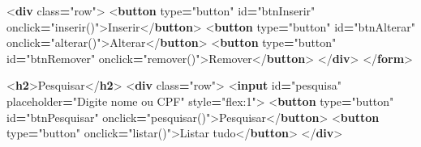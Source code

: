 \documentclass[
]{book}
\newenvironment{Shaded}{\begin{snugshade}}{\end{snugshade}}
\newcommand{\DataTypeTok}[1]{\textcolor[rgb]{0.13,0.29,0.53}{#1}}
\newcommand{\KeywordTok}[1]{\textcolor[rgb]{0.13,0.29,0.53}{\textbf{#1}}}
\newcommand{\NormalTok}[1]{#1}
\newcommand{\OperatorTok}[1]{\textcolor[rgb]{0.81,0.36,0.00}{\textbf{#1}}}
\newcommand{\OtherTok}[1]{\textcolor[rgb]{0.56,0.35,0.01}{#1}}
\newcommand{\StringTok}[1]{\textcolor[rgb]{0.31,0.60,0.02}{#1}}
\begin{document}
\begin{Shaded}
\begin{Highlighting}[]
  \DataTypeTok{\textless{}}\KeywordTok{div}\OtherTok{ class}\OperatorTok{=}\StringTok{"row"}\DataTypeTok{\textgreater{}}
    \DataTypeTok{\textless{}}\KeywordTok{button}\OtherTok{ type}\OperatorTok{=}\StringTok{"button"}\OtherTok{ id}\OperatorTok{=}\StringTok{"btnInserir"}\OtherTok{ onclick}\OperatorTok{=}\StringTok{"inserir()"}\DataTypeTok{\textgreater{}}\NormalTok{Inserir}\DataTypeTok{\textless{}/}\KeywordTok{button}\DataTypeTok{\textgreater{}}
    \DataTypeTok{\textless{}}\KeywordTok{button}\OtherTok{ type}\OperatorTok{=}\StringTok{"button"}\OtherTok{ id}\OperatorTok{=}\StringTok{"btnAlterar"}\OtherTok{ onclick}\OperatorTok{=}\StringTok{"alterar()"}\DataTypeTok{\textgreater{}}\NormalTok{Alterar}\DataTypeTok{\textless{}/}\KeywordTok{button}\DataTypeTok{\textgreater{}}
    \DataTypeTok{\textless{}}\KeywordTok{button}\OtherTok{ type}\OperatorTok{=}\StringTok{"button"}\OtherTok{ id}\OperatorTok{=}\StringTok{"btnRemover"}\OtherTok{ onclick}\OperatorTok{=}\StringTok{"remover()"}\DataTypeTok{\textgreater{}}\NormalTok{Remover}\DataTypeTok{\textless{}/}\KeywordTok{button}\DataTypeTok{\textgreater{}}
  \DataTypeTok{\textless{}/}\KeywordTok{div}\DataTypeTok{\textgreater{}}
\DataTypeTok{\textless{}/}\KeywordTok{form}\DataTypeTok{\textgreater{}}

\DataTypeTok{\textless{}}\KeywordTok{h2}\DataTypeTok{\textgreater{}}\NormalTok{Pesquisar}\DataTypeTok{\textless{}/}\KeywordTok{h2}\DataTypeTok{\textgreater{}}
\DataTypeTok{\textless{}}\KeywordTok{div}\OtherTok{ class}\OperatorTok{=}\StringTok{"row"}\DataTypeTok{\textgreater{}}
  \DataTypeTok{\textless{}}\KeywordTok{input}\OtherTok{ id}\OperatorTok{=}\StringTok{"pesquisa"}\OtherTok{ placeholder}\OperatorTok{=}\StringTok{"Digite nome ou CPF"}\OtherTok{ style}\OperatorTok{=}\StringTok{"flex:1"}\DataTypeTok{\textgreater{}}
  \DataTypeTok{\textless{}}\KeywordTok{button}\OtherTok{ type}\OperatorTok{=}\StringTok{"button"}\OtherTok{ id}\OperatorTok{=}\StringTok{"btnPesquisar"}\OtherTok{ onclick}\OperatorTok{=}\StringTok{"pesquisar()"}\DataTypeTok{\textgreater{}}\NormalTok{Pesquisar}\DataTypeTok{\textless{}/}\KeywordTok{button}\DataTypeTok{\textgreater{}}
  \DataTypeTok{\textless{}}\KeywordTok{button}\OtherTok{ type}\OperatorTok{=}\StringTok{"button"}\OtherTok{ onclick}\OperatorTok{=}\StringTok{"listar()"}\DataTypeTok{\textgreater{}}\NormalTok{Listar tudo}\DataTypeTok{\textless{}/}\KeywordTok{button}\DataTypeTok{\textgreater{}}
\DataTypeTok{\textless{}/}\KeywordTok{div}\DataTypeTok{\textgreater{}}


\end{Highlighting}
\end{Shaded}
\end{document}
